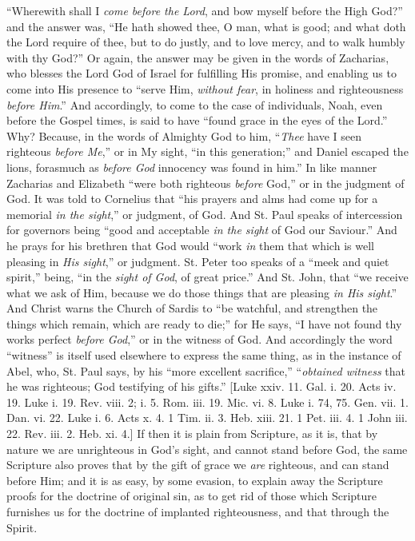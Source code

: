 ``Wherewith shall I \emph{come before the Lord}, and bow myself
before the High God?'' and the answer was, ``He hath showed
thee, O man, what is good; and what doth the Lord require of thee, but
to do justly, and to love mercy, and to walk humbly with thy
God?'' Or again, the answer may be given in the words of Zacharias,
who blesses the Lord God of Israel for fulfilling His promise, and
enabling us to come into His presence to ``serve Him, \emph{without
fear}, in holiness and righteousness \emph{before Him}.'' And
accordingly, to come to the case of individuals, Noah, even before the
Gospel times, is said to have ``found grace in the eyes of the
Lord.'' Why? Because, in the words of Almighty God to him,
``\emph{Thee} have I seen righteous \emph{before Me},'' or in My
sight, ``in this generation;'' and Daniel escaped the lions,
forasmuch as \emph{before God} innocency was found in him.'' In
like manner Zacharias and Elizabeth ``were both righteous \emph{before}
God,'' or in the judgment of God. It was told to Cornelius that
``his prayers and alms had come up for a memorial \emph{in the sight},''
or judgment, of God. And St. Paul speaks of intercession for governors
being ``good and acceptable \emph{in the sight} of God our Saviour.''
And he prays for his brethren that God would ``work \emph{in} them that
which is well pleasing in \emph{His sight},'' or judgment. St.
Peter too speaks of a ``meek and quiet spirit,'' being,
``in the \emph{sight of God}, of great price.'' And St. John,
that ``we receive what we ask of Him, because we do those things
that are pleasing \emph{in His sight}.'' And Christ warns the
Church of Sardis to ``be watchful, and strengthen the things which
remain, which are ready to die;'' for He says, ``I have not
found thy works perfect \emph{before God},'' or in the witness of
God. And accordingly the word ``witness'' is itself used
elsewhere to express the same thing, as in the instance of Abel, who,
St. Paul says, by his ``more excellent sacrifice,'' ``\emph{obtained
witness} that he was righteous; God testifying of his gifts.''
[Luke xxiv. 11. Gal. i. 20. Acts iv. 19. Luke i. 19. Rev. viii. 2; i.
5. Rom. iii. 19. Mic. vi. 8. Luke i. 74, 75. Gen. vii. 1. Dan. vi. 22.
Luke i. 6. Acts x. 4. 1 Tim. ii. 3. Heb. xiii. 21. 1 Pet. iii. 4. 1
John iii. 22. Rev. iii. 2. Heb. xi. 4.] If then it is plain from
Scripture, as it is, that by nature we are unrighteous in God's sight,
and cannot stand before God, the same Scripture also proves that by
the gift of grace we \emph{are} righteous, and can stand before Him; and it
is as easy, by some evasion, to explain away the Scripture proofs for
the doctrine of original sin, as to get rid of those which Scripture
furnishes us for the doctrine of implanted righteousness, and that
through the Spirit.

